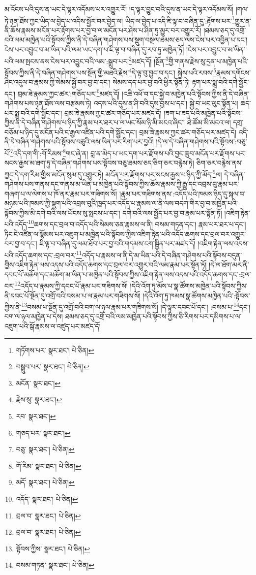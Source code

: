 མ་འོངས་པའི་དུས་ན་ཡང་དེ་ལྟར་འདོམས་པར་འགྱུར་རོ། །ད་ལྟར་བྱུང་བའི་དུས་ན་ཡང་དེ་ལྟར་འདོམས་སོ། །གལ་ཏེ་ཉན་ཐོས་ཀྱང་ཡིད་ལ་བྱེད་པ་འདིས་སྦྱོར་བར་བྱེད་ལ། ཡིད་ལ་བྱེད་པ་འདི་ཇི་ལྟ་བ་བཞིན་དུ་:རྟོགས་པར་\footnote{གཏོགས་པར་  སྣར་ཐང་།  པེ་ཅིན། }གྱུར་ན་ནི་ཆོས་རྣམས་མངོན་པར་རྟོགས་པར་བྱ་བ་ལ་མངོན་པར་ཤེས་པ་ཤིན་ཏུ་མྱུར་བར་འགྱུར་རོ། །ཐམས་ཅད་དུ་འགྲོ་བའི་ལམ་མཁྱེན་པའི་སྟོབས་ཀྱིས་ནི་དེ་བཞིན་གཤེགས་པས་སྡུག་བསྔལ་ཐམས་ཅད་ལས་ངེས་པར་འབྱིན་པ་དང་། ངེས་པར་འབྱུང་བ་མ་ཡིན་པའི་ལམ་ཡང་དག་པ་ཇི་ལྟ་བ་བཞིན་དུ་རབ་ཏུ་མཁྱེན་ཏོ། །ངེས་པར་འབྱུང་བ་མ་ཡིན་པའི་ལམ་སྤངས་ནས་ངེས་པར་འབྱུང་བའི་ལམ་:སྒྲུབ་པར་\footnote{བསྒྲུབ་པར་  སྣར་ཐང་།  པེ་ཅིན། }མཛད་དོ། །སྔོན་\footnote{མངོན་  སྣར་ཐང་། }གྱི་གནས་རྗེས་སུ་དྲན་པ་མཁྱེན་པའི་སྟོབས་ཀྱིས་ནི་དེ་བཞིན་གཤེགས་པས་སྔོན་གྱི་མཐའི་རྗེས་\footnote{རྗེས་སུ་  སྣར་ཐང་། }དེ་ལྟ་བུ་བྱུང་བ་དང་། སྐྱེས་པའི་རབས་\footnote{རབ་  སྣར་ཐང་། }རྣམས་དགོངས་ཤིང་འདུལ་བ་རྣམས་ཀྱི་སེམས་སྐྱོ་བར་བྱ་བ་དང་། སེམས་དད་པར་བྱ་བའི་ཕྱིར་སྟོན་ཏེ། རྟག་པར་སྨྲ་བའི་དགེ་སྦྱོང་དང་། བྲམ་ཟེ་རྣམས་ཀྱང་ཚར་:གཅོད་པར་\footnote{གཅད་པར་  སྣར་ཐང་། }མཛད་དོ། །འཆི་འཕོ་བ་དང་སྐྱེ་བ་མཁྱེན་པའི་སྟོབས་ཀྱིས་ནི་དེ་བཞིན་གཤེགས་པས་ཉན་ཐོས་ལས་བརྩམས་ཏེ། འདས་པའི་དུས་ན་ཤི་བའི་དུས་བྱས་པ་དང་། སྐྱེ་བ་ཡང་ལུང་སྟོན་པ། ཆད་པར་སྨྲ་བའི་དགེ་སྦྱོང་དང་། བྲམ་ཟེ་རྣམས་ཀྱང་ཚར་གཅོད་པར་མཛད་དོ། །ཟག་པ་ཟད་པའི་མཁྱེན་པའི་སྟོབས་ཀྱིས་ནི་དེ་བཞིན་གཤེགས་པ་ཉིད་ཀྱི་རྣམ་པར་ཐར་པ་ལ་ཡང་སོམ་ཉི་མི་མངའ་ཞིང་། ཐེ་ཚོམ་མི་མངའ་ལ། དགྲ་བཅོམ་པ་ཉིད་དུ་མངོན་པའི་ང་རྒྱལ་འཛིན་པའི་དགེ་སྦྱོང་དང་། བྲམ་ཟེ་རྣམས་ཀྱང་ཚར་གཅོད་པར་མཛད་དེ། འདི་ནི་དེ་བཞིན་གཤེགས་པའི་སྟོབས་བཅུའི་ལས་ཡིན་པར་རིག་པར་བྱའོ། །དེ་ལ་དེ་བཞིན་གཤེགས་པའི་སྟོབས་:བཅུ་པོ་\footnote{བཅུ་  སྣར་ཐང་།  པེ་ཅིན། }འདི་དག་གི་:གོ་རིམས་\footnote{གོ་རིམ་  སྣར་ཐང་།  པེ་ཅིན། }གང་ཞེ་ན། བླ་ན་མེད་པ་ཡང་དག་པར་རྫོགས་པའི་བྱང་ཆུབ་མངོན་པར་རྫོགས་པར་སངས་རྒྱས་མ་ཐག་ཏུ་དེ་བཞིན་གཤེགས་པས་སྟོབས་བཅུ་ཐམས་ཅད་ཅིག་ཅར་བརྙེས་ཏེ། ཅིག་ཅར་བརྙེས་ནས་ཀྱང་དེ་དག་རིམ་གྱིས་མངོན་སུམ་དུ་འགྱུར་ཏེ། མངོན་པར་རྫོགས་པར་སངས་རྒྱས་པ་ཉིད་ཀྱི་མོད་\footnote{མདོ་  སྣར་ཐང་།  པེ་ཅིན། }ལ། དེ་བཞིན་གཤེགས་པས་གནས་དང་གནས་མ་ཡིན་པ་མཁྱེན་པའི་སྟོབས་ཀྱིས་ཆོས་རྣམས་ཀྱི་རྒྱུ་དང་འབྲས་བུ་རྣམ་པར་གཞག་པ་ལ་ལེགས་པ་ཁོ་ནར་རྣམ་པར་གཟིགས་སོ། །རྣམ་པར་གཟིགས་ནས་:འདོད་པའི་ཁམས་ཉིད་དུ་སྐལ་བ་མཉམ་པའི་ཁམས་ཀྱི་སྡུག་པའི་འབྲས་བུའི་ཁྱད་པར་འདོད་པ་རྣམས་ལ་ནི་ལས་བདག་གིར་བྱ་བ་མཁྱེན་པའི་སྟོབས་ཀྱིས་མི་དགེ་བའི་ལས་ཡོངས་སུ་སྤངས་པ་དང་། དགེ་བའི་ལས་སྤྱོད་པར་བྱ་བ་རྣམ་པར་སྟོན་ཏོ། །འཇིག་རྟེན་པའི་འདོད་\footnote{འདོད་  སྣར་ཐང་།  པེ་ཅིན། }ཆགས་དང་བྲལ་བ་འདོད་པའི་སེམས་ཅན་རྣམས་ལ་ནི། བསམ་གཏན་དང་། རྣམ་པར་ཐར་པ་དང་། ཏིང་ངེ་འཛིན་ལ་སྙོམས་པར་འཇུག་པ་མཁྱེན་པའི་སྟོབས་ཀྱིས་འཇིག་རྟེན་པའི་འདོད་ཆགས་དང་བྲལ་བར་འགྱུར་བར་བྱ་བ་དང་། ཇི་ལྟ་བ་བཞིན་དུ་ལམ་ཐོབ་པར་བྱ་བའི་གདམས་ངག་སྦྱིན་པར་མཛད་དོ། །འཇིག་རྟེན་ལས་འདས་པའི་འདོད་ཆགས་དང་:བྲལ་བར་\footnote{བྲལ་བ་  སྣར་ཐང་།  པེ་ཅིན། }འདོད་པ་རྣམས་ལ་ནི་དེ་མ་ཡིན་པའི་དེ་བཞིན་གཤེགས་པའི་སྟོབས་བདུན་གྱིས་འཇིག་རྟེན་ལས་འདས་པའི་འདོད་ཆགས་དང་བྲལ་བར་འགྱུར་བའི་ལམ་རྣམ་པར་སྟོན་ཏོ། །དེ་ལ་ཐོག་མར་ནི་དབང་པོ་མཆོག་དང་མཆོག་མ་ཡིན་པ་མཁྱེན་པའི་སྟོབས་ཀྱིས་འཇིག་རྟེན་ལས་འདས་པའི་འདོད་ཆགས་དང་:བྲལ་བར་\footnote{བྲལ་བ་  སྣར་ཐང་།  པེ་ཅིན། }འདོད་པ་རྣམས་ཀྱི་དབང་པོ་རྣམ་པར་གཟིགས་སོ། །དེའི་འོག་ཏུ་མོས་པ་སྣ་ཚོགས་མཁྱེན་པའི་སྟོབས་ཀྱིས་ནི་དབང་པོ་སྔོན་དུ་འགྲོ་བའི་བསམ་པ་ལ་རྣམ་པར་གཟིགས་སོ། །དེའི་འོག་ཏུ་ཁམས་སྣ་ཚོགས་མཁྱེན་པའི་:སྟོབས་ཀྱིས་ནི་\footnote{སྟོབས་ཀྱིས་  སྣར་ཐང་།  པེ་ཅིན། }བསམ་པ་སྔོན་དུ་འགྲོ་བའི་བག་ལ་ཉལ་རྣམ་པར་གཟིགས་སོ། །དེ་ལྟར་དབང་པོ་དང་། :བསམ་པ་\footnote{བསམ་གཏན་  སྣར་ཐང་།  པེ་ཅིན། }དང་། བག་ལ་ཉལ་མཁྱེན་པ་དེས། ཐམས་ཅད་དུ་འགྲོ་བའི་ལམ་མཁྱེན་པའི་སྟོབས་ཀྱིས་ཅི་རིགས་པར་དམིགས་པ་ལ་འཇུག་པའི་སྒོ་རྣམས་ལ་འཛུད་པར་མཛད་དོ། 